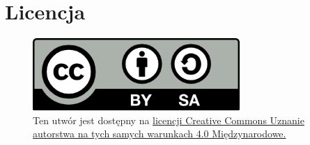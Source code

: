\section*{Licencja}
\begin{figure}[h]
	\begin{minipage}[c]{0.25\textwidth}
		\includegraphics[width=0.7\textwidth]{img/licencja.png}
	\end{minipage}\hfill
	\begin{minipage}[c]{0.75\textwidth}
		\caption*{
			Ten utwór jest dostępny na
			\href{https://creativecommons.org/licenses/by-sa/4.0/}{licencji Creative Commons Uznanie autorstwa
				na tych samych warunkach 4.0 Międzynarodowe.}
		}
	\end{minipage}
\end{figure}
